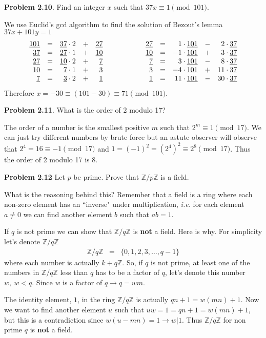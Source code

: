 \documentclass[aps,preprint,preprintnumbers,nofootinbib,showpacs,prd]{revtex4-1}
\newcommand{\ie}{{\it i.e.} }
\newcommand{\ba}{\begin{array}}
\newcommand{\ea}{\end{array}}
\newcommand{\nbea}{\begin{eqnarray*}}
\newcommand{\neea}{\end{eqnarray*}}
\begin{document}
{\bf Problem 2.10}. Find an integer $x$ such that $37x \equiv 1 \pmod{101}$.

We use Euclid's gcd algorithm to find the solution of Bezout's lemma $37x + 101y = 1$
%
\nbea
\ba{r c r c r   c   r c r c r}
\underline{101} & = & \underline{37} \cdot 2 & + & \underline{27} & ~~~~~~~~~~~~ & \underline{27} & = & 1 \cdot \underline{101} & - & 2 \cdot \underline{37} \\
\underline{37} & = & \underline{27} \cdot 1 & + & \underline{10} & & \underline{10} & = & -1 \cdot \underline{101} & + & 3 \cdot \underline{37} \\
\underline{27} & = & \underline{10} \cdot 2 & + & \underline{7} & & \underline{7} & = & 3 \cdot \underline{101} & - & 8 \cdot \underline{37} \\
\underline{10} & = & \underline{7} \cdot 1 & + & \underline{3} & & \underline{3} & = & -4 \cdot \underline{101}  & + & 11 \cdot \underline{37} \\
\underline{7} & = & \underline{3} \cdot 2 & + & \underline{1} & & \underline{1} & = & 11 \cdot \underline{101} & - & 30 \cdot \underline{37}
\ea
\neea
%
Therefore $x=-30 \equiv (101 - 30) \equiv 71 \pmod{101}$.

{\bf Problem 2.11}. What is the order of 2 modulo 17?

The order of a number is the smallest positive $m$ such that $2^m \equiv 1 \pmod{17}$. We can just try different numbers by brute force but an astute observer will observe that $2^4 = 16 \equiv -1 \pmod{17}$ and $1 = (-1)^2 = (2^4)^2 \equiv 2^8 \pmod {17}$. Thus the order of 2 modulo 17 is 8.

{\bf Problem 2.12} Let $p$ be prime. Prove that $\mathbb{Z}/p\mathbb{Z}$ is a field.

What is the reasoning behind this? Remember that a field is a ring where each non-zero element has an ``inverse" under multiplication, \ie for each element $a \neq 0$ we can find another element $b$ such that $ab=1$.

If $q$ is not prime we can show that $\mathbb{Z}/q\mathbb{Z}$ is {\bf not} a field. Here is why. For simplicity let's denote $\mathbb{Z}/q\mathbb{Z}$
%
\nbea
\mathbb{Z}/q\mathbb{Z} & = & \{0,1,2,3, \dots, q-1\}
\neea
%
where each number is actually $k + q\mathbb{Z}$. So, if $q$ is not prime, at least one of the numbers in $\mathbb{Z}/q\mathbb{Z}$ less than $q$ has to be a factor of $q$, let's denote this number $w,~w < q$. Since $w$ is a factor of $q \to q = w m$.

The identity element, $1$, in the ring $\mathbb{Z}/q\mathbb{Z}$ is actually $qn + 1 = w(mn) + 1$. Now we want to find another element $u$ such that $uw = 1 = qn + 1 = w(mn) + 1$, but this is a contradiction since $w (u - mn) = 1 \to w|1$. Thus $\mathbb{Z}/q\mathbb{Z}$ for non prime $q$ is {\bf not} a field.
\end{document}
